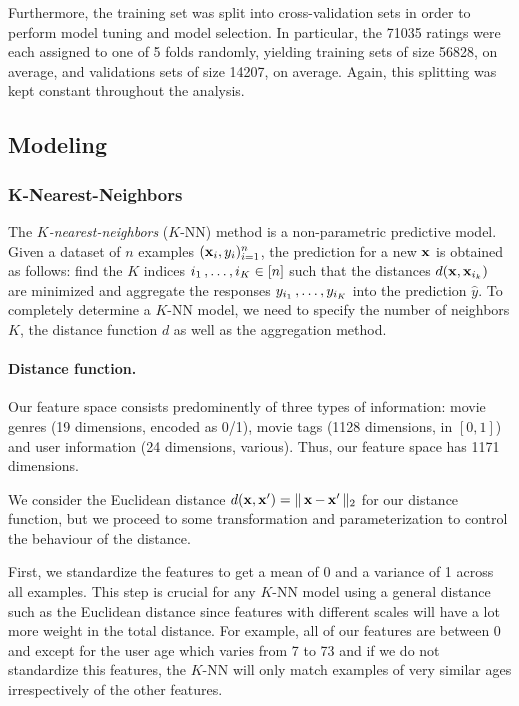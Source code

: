 \documentclass[bj, preprint]{imsart}
\begin{document}
Furthermore, the training set was split into cross-validation sets in order to perform model tuning and model selection. 
In particular, the \num{71035} ratings were each assigned to one of 5 folds randomly, yielding training sets of size \num{56828}, on average, and validations sets of size \num{14207}, on average. 
Again, this splitting was kept constant throughout the analysis.

\subsection{Modeling}\label{subsec:method.models}

\subsubsection{K-Nearest-Neighbors}\label{subsubsec:method.models.knn}

The \textit{$K$-nearest-neighbors} ($K$-NN) method is a non-parametric predictive model. 
Given a dataset of $n$ examples $(\operatorname{\mathbf x}_i, y_i)_{i=1}^n$, the prediction for a new $\operatorname{\mathbf x}$ is obtained as follows: find the $K$ indices $i_1\operatorname{,\ldots ,} i_K\in[n]$ such that the distances $d(\operatorname{\mathbf x}, \operatorname{\mathbf x}_{i_k})$ are minimized and aggregate the responses $y_{i_1}\operatorname{,\ldots ,} y_{i_K}$ into the prediction $\hat{y}$.
To completely determine a $K$-NN model, we need to specify the number of neighbors $K$, the distance function $d$ as well as the aggregation method.

\paragraph{Distance function.}\label{par:method.models.knn.distance}

Our feature space consists predominently of three types of information: movie genres (19 dimensions, encoded as 0/1), movie tags (1128 dimensions, in $[0,1]$) and user information (24 dimensions, various). Thus, our feature space has \num{1171} dimensions. 

We consider the Euclidean distance $d(\operatorname{\mathbf x},\operatorname{\mathbf x}')=\Vert\operatorname{\mathbf x}-\operatorname{\mathbf x}'\Vert_2$ for our distance function, but we proceed to some transformation and parameterization to control the behaviour of the distance. 

First, we standardize the features to get a mean of 0 and a variance of 1 across all examples. This step is crucial for any $K$-NN model using a general distance such as the Euclidean distance since features with different scales will have a lot more weight in the total distance. For example, all of our features are between 0 and except for the user age which varies from 7 to 73 and if we do not standardize this features, the $K$-NN will only match examples of very similar ages irrespectively of the other features.
\end{document}
